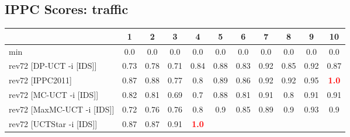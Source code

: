 \documentclass{article}
\begin{document}
\bigskip

\subsection*{IPPC Scores: traffic}

\begin{tabular}{|l|r@{$\pm$}rr@{$\pm$}rr@{$\pm$}rr@{$\pm$}rr@{$\pm$}rr@{$\pm$}rr@{$\pm$}rr@{$\pm$}rr@{$\pm$}rr@{$\pm$}r|}
\hline

& \multicolumn{2}{c}{1}
& \multicolumn{2}{c}{2}
& \multicolumn{2}{c}{3}
& \multicolumn{2}{c}{4}
& \multicolumn{2}{c}{5}
& \multicolumn{2}{c}{6}
& \multicolumn{2}{c}{7}
& \multicolumn{2}{c}{8}
& \multicolumn{2}{c}{9}
& \multicolumn{2}{c|}{10}
\\
\hline
\hline
min
& \multicolumn{2}{c}{0.0}
& \multicolumn{2}{c}{0.0}
& \multicolumn{2}{c}{0.0}
& \multicolumn{2}{c}{0.0}
& \multicolumn{2}{c}{0.0}
& \multicolumn{2}{c}{0.0}
& \multicolumn{2}{c}{0.0}
& \multicolumn{2}{c}{0.0}
& \multicolumn{2}{c}{0.0}
& \multicolumn{2}{c|}{0.0}
\\
rev72 [DP-UCT -i [IDS]]
& \multicolumn{2}{c}{0.73}
& \multicolumn{2}{c}{0.78}
& \multicolumn{2}{c}{0.71}
& \multicolumn{2}{c}{0.84}
& \multicolumn{2}{c}{0.88}
& \multicolumn{2}{c}{0.83}
& \multicolumn{2}{c}{0.92}
& \multicolumn{2}{c}{0.85}
& \multicolumn{2}{c}{0.92}
& \multicolumn{2}{c|}{0.87}
\\
rev72 [IPPC2011]
& \multicolumn{2}{c}{0.87}
& \multicolumn{2}{c}{0.88}
& \multicolumn{2}{c}{0.77}
& \multicolumn{2}{c}{0.8}
& \multicolumn{2}{c}{0.89}
& \multicolumn{2}{c}{0.86}
& \multicolumn{2}{c}{0.92}
& \multicolumn{2}{c}{0.92}
& \multicolumn{2}{c}{0.95}
& \multicolumn{2}{c|}{\textbf{\textcolor{red}{1.0}}}
\\
rev72 [MC-UCT -i [IDS]]
& \multicolumn{2}{c}{0.82}
& \multicolumn{2}{c}{0.81}
& \multicolumn{2}{c}{0.69}
& \multicolumn{2}{c}{0.7}
& \multicolumn{2}{c}{0.88}
& \multicolumn{2}{c}{0.81}
& \multicolumn{2}{c}{0.91}
& \multicolumn{2}{c}{0.8}
& \multicolumn{2}{c}{0.91}
& \multicolumn{2}{c|}{0.91}
\\
rev72 [MaxMC-UCT -i [IDS]]
& \multicolumn{2}{c}{0.72}
& \multicolumn{2}{c}{0.76}
& \multicolumn{2}{c}{0.76}
& \multicolumn{2}{c}{0.8}
& \multicolumn{2}{c}{0.9}
& \multicolumn{2}{c}{0.85}
& \multicolumn{2}{c}{0.89}
& \multicolumn{2}{c}{0.9}
& \multicolumn{2}{c}{0.93}
& \multicolumn{2}{c|}{0.9}
\\
rev72 [UCTStar -i [IDS]]
& \multicolumn{2}{c}{0.87}
& \multicolumn{2}{c}{0.87}
& \multicolumn{2}{c}{0.91}
& \multicolumn{2}{c}{\textbf{\textcolor{red}{1.0}}}

\end{tabular}
\end{document}
